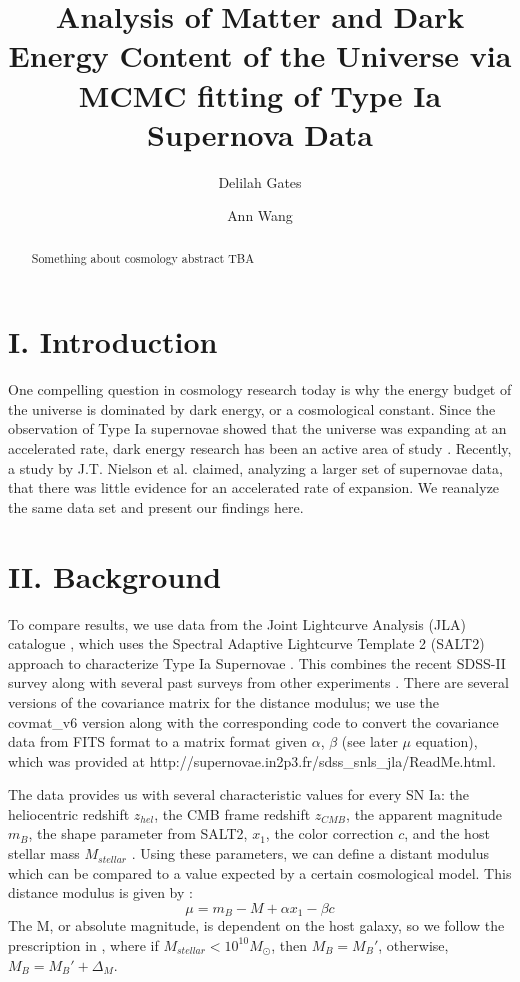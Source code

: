 \documentclass[aps,prl,reprint]{revtex4-1}
\begin{document}

\title{	Analysis of Matter and Dark Energy Content of the Universe via MCMC fitting of Type Ia Supernova Data}
\author{Delilah Gates}
\author{Ann Wang}
\begin{abstract}
Something about cosmology abstract TBA
\end{abstract}
\maketitle
\section{I. Introduction}
One compelling question in cosmology research today is why the energy budget of the universe is dominated by dark energy, or a cosmological constant. Since the observation of Type Ia supernovae showed that the universe was expanding at an accelerated rate, dark energy research has been an active area of study \cite{riess_sn}. Recently, a study by J.T. Nielson et al. \cite{shocker} claimed, analyzing a larger set of supernovae data, that there was little evidence for an accelerated rate of expansion. We reanalyze the same data set and present our findings here.
\section{II. Background}
To compare results, we use data from the Joint Lightcurve Analysis (JLA) catalogue \cite{sdss}, which uses the Spectral Adaptive Lightcurve Template 2 (SALT2) approach to characterize Type Ia Supernovae \cite{salt2}. This combines the recent SDSS-II survey along with several past surveys from other experiments \cite{sdss}. There are several versions of the covariance matrix for the distance modulus; we use the covmat\_v6 version along with the corresponding code to convert the covariance data from FITS format \cite{fits} to a matrix format given $\alpha$, $\beta$ (see later $\mu$ equation), which was provided at http://supernovae.in2p3.fr/sdss\_snls\_jla/ReadMe.html. 
\par The data provides us with several characteristic values for every SN Ia: the heliocentric redshift $z_{hel}$, the CMB frame redshift $z_{CMB}$, the apparent magnitude $m_B$, the shape parameter from SALT2, $x_1$, the color correction $c$, and the host stellar mass $M_{stellar}$ \cite{sdss}. Using these parameters, we can define a distant modulus which can be compared to a value expected by a certain cosmological model. This distance modulus is given by \cite{sdss}: 
\begin{equation}
\mu = m_B - M + \alpha x_1 - \beta c
\end{equation}
The M, or absolute magnitude, is dependent on the host galaxy, so we follow the prescription in \cite{sdss}, where if $M_{stellar} < 10^{10} M_{\odot}$, then $M_B = M_B'$, otherwise, $M_B = M_B' + \Delta_M$. 
\end{document}
